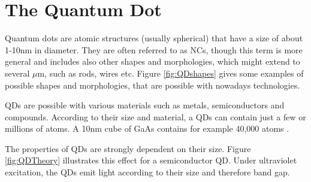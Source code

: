 \chapter{The Quantum Dot} \label{sec:QuantumDot} 

	Quantum dots are atomic structures (usually spherical) that have a size of about 1-10nm in diameter. They are often referred to as \glspl{NC}, though this
	term is more general and includes also other shapes and morphologies, which might extend to several $\mu$m, such as rods, wires etc.
	Figure \ref{fig:QDshapes} gives some examples of possible shapes and morphologies, that are possible with nowadays technologies.
	
	\glspl{QD} are possible with various materials such as metals, semiconductors and compounds. According to their size and material,
	a \glspl{QD} can contain just a few or millions of atoms. A 10nm cube of GaAs contains for example 40,000 atoms \cite{SalehTeich}.
	
	The properties of \glspl{QD} are strongly dependent on their size. Figure \ref{fig:QDTheory} illustrates this effect for a semiconductor \gls{QD}.
	Under ultraviolet excitation, the \glspl{QD} emit light according to their size and therefore band gap.
	
